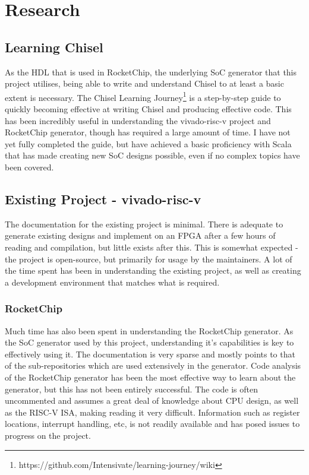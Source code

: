 \section{Research}
\label{sec:background}
\subsection{Learning Chisel}
As the HDL that is used in RocketChip\cite{rocketchip}, the underlying SoC generator that this project utilises, being able to write and understand Chisel to at least a basic extent is necessary. The Chisel Learning Journey\footnote{https://github.com/Intensivate/learning-journey/wiki} is a step-by-step guide to quickly becoming effective at writing Chisel and producing effective code. This has been incredibly useful in understanding the vivado-risc-v\cite{vivado-risc-v} project and RocketChip generator, though has required a large amount of time. I have not yet fully completed the guide, but have achieved a basic proficiency with Scala that has made creating new SoC designs possible, even if no complex topics have been covered.

\subsection{Existing Project - vivado-risc-v\cite{vivado-risc-v}}
The documentation for the existing project is minimal. There is adequate to generate existing designs and implement on an FPGA after a few hours of reading and compilation, but little exists after this. This is somewhat expected - the project is open-source, but primarily for usage by the maintainers. A lot of the time spent has been in understanding the existing project, as well as creating a development environment that matches what is required. 

\subsubsection{RocketChip}
Much time has also been spent in understanding the RocketChip generator\cite{rocketchip}. As the SoC generator used by this project, understanding it's capabilities is key to effectively using it. The documentation is very sparse and mostly points to that of the sub-repositories which are used extensively in the generator. Code analysis of the RocketChip generator has been the most effective way to learn about the generator, but this has not been entirely successful. The code is often uncommented and assumes a great deal of knowledge about CPU design, as well as the RISC-V ISA, making reading it very difficult. Information such as register locations, interrupt handling, etc, is not readily available and has posed issues to progress on the project.

